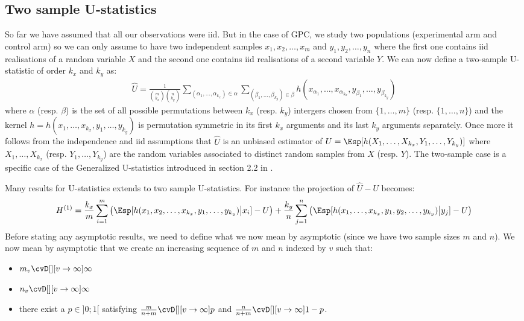 \documentclass[12pt]{article}
\begin{document}
\subsection{Two sample U-statistics}
\label{sec:org2f08c9f}

So far we have assumed that all our observations were iid. But in the
case of GPC, we study two populations (experimental arm and control
arm) so we can only assume to have two independent samples
\(x_1,x_2,\ldots,x_m\) and \(y_1,y_2,\ldots,y_n\) where the first one
contains iid realisations of a random variable \(X\) and the second
one contains iid realisations of a second variable \(Y\). We can now
define a two-sample U-statistic of order \(k_x\) and \(k_y\) as:
\begin{align*}
\hat{U} = \frac{1}{{m \choose k_x}{n \choose k_y}} \sum_{(\alpha_1,\ldots,\alpha_{k_x})\in \alpha} \sum_{(\beta_1,\ldots,\beta_{k_y})\in \beta} h(x_{\alpha_{1}},\ldots,x_{\alpha_{k_x}},y_{\beta_1},\ldots,y_{\beta_{k_y}})
\end{align*}
where \(\alpha\) (resp. \(\beta\)) is the set of all possible
 permutations between \(k_x\) (resp. \(k_y\)) intergers chosen from
 \(\{1,\ldots,m\}\) (resp.  \(\{1,\ldots,n\}\)) and the kernel
 \(h=h(x_1,\ldots,x_{k_x},y_1,\ldots,y_{k_y})\) is permutation symmetric in
 its first \(k_x\) arguments and its last \(k_y\) arguments
 separately. Once more it follows from the independence and iid
 assumptions that \(\hat{U}\) is an unbiased estimator of \(U =
 \Esp[h(X_1,\ldots,X_{k_x},Y_1,\ldots,Y_{k_y})]\) where \(X_1,\ldots,X_{k_x}\)
 (resp. \(Y_1,\ldots,Y_{k_y}\)) are the random variables associated to
 distinct random samples from \(X\) (resp. \(Y\)). The two-sample case
 is a specific case of the Generalized U-statistics introduced in
 section 2.2 in \cite{lee1990u}.

\bigskip

Many results for U-statistics extends to two sample U-statistics. For
instance the \Hajek projection of \(\hat{U}-U\) becomes:
\begin{align*}
H^{(1)} = \frac{k_x}{m} \sum_{i=1}^{m} \left( \Esp[h(x_1,x_2,\ldots,x_{k_x},y_1,\ldots,y_{k_y}) \big| x_i] - U \right) + \frac{k_y}{n} \sum_{j=1}^{n} \left( \Esp[h(x_1,\ldots,x_{k_x},y_1,y_2,\ldots,y_{k_y}) \big| y_j] - U \right)
\end{align*}
Before stating any asymptotic results, we need to define what we now
mean by asymptotic (since we have two sample sizes \(m\) and
\(n\)). We now mean by asymptotic that we create an increasing
sequence of \(m\) and \(n\) indexed by \(v\) such that:
\begin{itemize}
\item \(m_v \cvD[][v \rightarrow \infty] \infty\)
\item \(n_v \cvD[][v \rightarrow \infty] \infty\)
\item there exist a \(p \in ]0;1[\) satisfying \(\frac{m}{n+m} \cvD[][v
  \rightarrow \infty] p\) and \(\frac{n}{n+m} \cvD[][v \rightarrow
  \infty] 1-p\).
\end{itemize}
\end{document}
